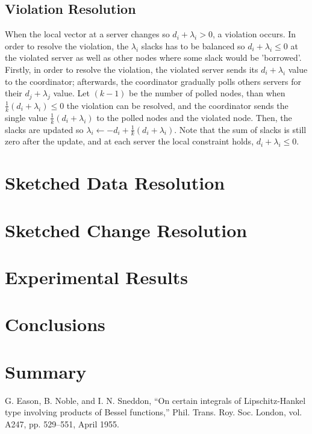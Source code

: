 \documentclass[10pt, conference]{IEEEtran}
\begin{document}
\subsection{Violation Resolution}
When the local vector at a server changes so $d_i + \lambda _i > 0$, a violation occurs. In order to resolve the violation, the $\lambda _i$ slacks has to be balanced so $d_i + \lambda _i \leq 0$ at the violated server as well as other nodes where some slack would be 'borrowed'. \\
Firstly, in order to resolve the violation, the violated server sends its $d_i + \lambda _i$ value to the coordinator; afterwards, the coordinator gradually polls others servers for their $d_j + \lambda _j$ value. Let $(k-1)$ be the number of polled nodes, than when $\frac{1}{k}(d_i + \lambda _i) \leq 0$ the violation can be resolved, and the coordinator sends the single value $\frac{1}{k}(d_i + \lambda _i)$ to the polled nodes and the violated node. Then, the slacks are updated so $\lambda _i 
\leftarrow -d_i + \frac{1}{k}(d_i + \lambda _i)$. Note that the sum of slacks is still zero after the update, and at each server the local constraint holds, $d_i + \lambda _i \leq 0$.
\section{Sketched Data Resolution}

\section{Sketched Change Resolution}

\section{Experimental Results}

\section{Conclusions}

\section{Summary}

\begin{thebibliography}{00}
 G. Eason, B. Noble, and I. N. Sneddon, ``On certain integrals of Lipschitz-Hankel type involving products of Bessel functions,'' Phil. Trans. Roy. Soc. London, vol. A247, pp. 529--551, April 1955.
\end{thebibliography}
\end{document}
